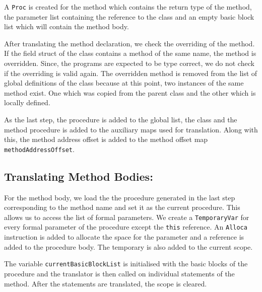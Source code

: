 \documentclass[]{tukportfolio}
\begin{document}
	A \lstinline|Proc| is created for the method which contains the return type of the method, the parameter list containing the reference to the class and an empty basic block list which will contain the method body.
	
	After translating the method declaration, we check the overriding of the method. If the field struct of the class contains a method of the same name, the method is overridden. Since, the programs are expected to be type correct, we do not check if the overriding is valid again. The overridden method is removed from the list of global definitions of the class because at this point, two instances of the same method exist. One which was copied from the parent class and the other which is locally defined.
	
	As the last step, the procedure is added to the global list, the class and the method procedure is added to the auxiliary maps used for translation. Along with this, the method address offset is added to the method offset map \lstinline|methodAddressOffset|.
	
	\subsection{Translating Method Bodies:}
	
	For the method body, we load the the procedure generated  in the last step corresponding to the method name and set it as the current procedure. This allows us to access the list of formal parameters. We create a \lstinline|TemporaryVar| for every formal parameter of the procedure except the \lstinline|this| reference. An \lstinline|Alloca| instruction is added to allocate the space for the parameter and a reference is added to the procedure body. The temporary is also added to the current scope. 
	
	The variable \lstinline|currentBasicBlockList| is initialised with the basic blocks of the procedure and the translator is then called on individual statements of the method. After the statements are translated, the scope is cleared.
	
\end{document}
